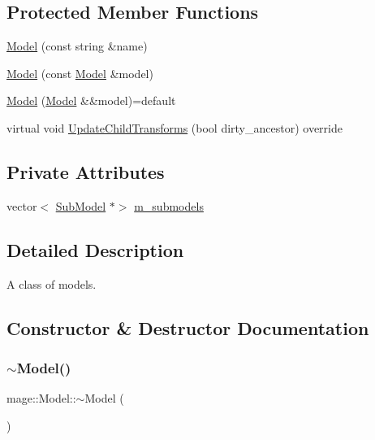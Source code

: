 \subsection*{Protected Member Functions}
\begin{DoxyCompactItemize}
\item 
\hyperlink{classmage_1_1_model_adc37cc2030a93cde5da20f9a941c060e}{Model} (const string \&name)
\item 
\hyperlink{classmage_1_1_model_ac5f1d340bbfefd30bec3e6343a86059a}{Model} (const \hyperlink{classmage_1_1_model}{Model} \&model)
\item 
\hyperlink{classmage_1_1_model_a085272d7cb82587094f18747ecc5aad0}{Model} (\hyperlink{classmage_1_1_model}{Model} \&\&model)=default
\item 
virtual void \hyperlink{classmage_1_1_model_a2f3c812220367093bdca125e6b6e898a}{Update\+Child\+Transforms} (bool dirty\+\_\+ancestor) override
\end{DoxyCompactItemize}
\subsection*{Private Attributes}
\begin{DoxyCompactItemize}
\item 
vector$<$ \hyperlink{classmage_1_1_sub_model}{Sub\+Model} $\ast$$>$ \hyperlink{classmage_1_1_model_ab62e74450091e144b7b62d6570ec7af7}{m\+\_\+submodels}
\end{DoxyCompactItemize}


\subsection{Detailed Description}
A class of models. 

\subsection{Constructor \& Destructor Documentation}
\hypertarget{classmage_1_1_model_af9f45ed2dcf470f85bbfd144ca9857a7}{}\label{classmage_1_1_model_af9f45ed2dcf470f85bbfd144ca9857a7} 
\subsubsection{\texorpdfstring{$\sim$\+Model()}{~Model()}}
{\footnotesize\ttfamily mage\+::\+Model\+::$\sim$\+Model (\begin{DoxyParamCaption}{ }\end{DoxyParamCaption})\hspace{0.3cm}{\ttfamily [virtual]}}

